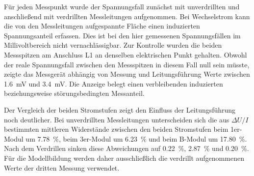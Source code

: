 Für jeden Messpunkt wurde der Spannungsfall zunächst mit unverdrillten und
anschließend mit verdrillten Messleitungen aufgenommen. Bei Wechselstrom kann
die von den Messleitungen aufgespannte Fläche einen induzierten
Spannungsanteil erfassen. Dies ist bei den hier gemessenen Spannungsfällen im
Millivoltbereich nicht vernachlässigbar. Zur Kontrolle wurden die beiden
Messspitzen am Anschluss L1 an denselben elektrischen Punkt gehalten. Obwohl
der reale Spannungsfall zwischen den Messspitzen in diesem Fall null sein
müsste, zeigte das Messgerät abhängig von Messung und Leitungsführung Werte
zwischen \SI{1.6}{\milli\volt} und \SI{3.4}{\milli\volt}. Die Anzeige belegt
einen verbleibenden induzierten beziehungsweise störungsbedingten
Messanteil.

Der Vergleich der beiden Stromstufen zeigt den Einfluss der Leitungsführung
noch deutlicher. Bei unverdrillten Messleitungen unterscheiden sich die aus
\(\Delta U/I\) bestimmten mittleren Widerstände zwischen den beiden
Stromstufen beim 1er-Modul um \SI{7.78}{\percent}, beim 3er-Modul um
\SI{6.23}{\percent} und beim B-Modul um \SI{17.80}{\percent}. Nach dem
Verdrillen sinken diese Abweichungen auf \SI{0.22}{\percent},
\SI{2.87}{\percent} und \SI{0.20}{\percent}. Für die Modellbildung werden
daher ausschließlich die verdrillt aufgenommenen Werte der dritten Messung
verwendet.


